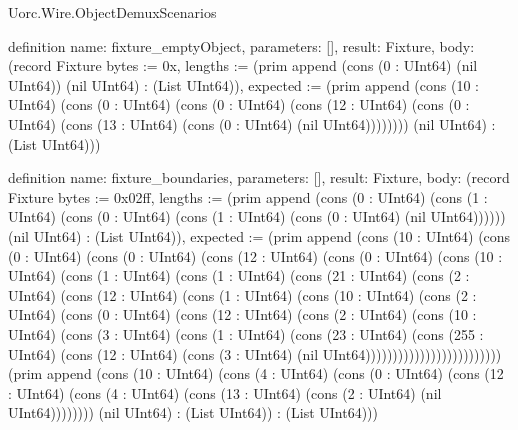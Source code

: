 \begin{lexlean}{Uorc.Wire.ObjectDemuxScenarios}
\begin{semanticmodule}
definition{
  name: fixture_emptyObject,
  parameters: [],
  result: Fixture,
  body: (record Fixture {bytes := 0x, lengths := (prim append (cons (0 : UInt64) (nil UInt64)) (nil UInt64) : (List UInt64)), expected := (prim append (cons (10 : UInt64) (cons (0 : UInt64) (cons (0 : UInt64) (cons (12 : UInt64) (cons (0 : UInt64) (cons (13 : UInt64) (cons (0 : UInt64) (nil UInt64)))))))) (nil UInt64) : (List UInt64))})
}

definition{
  name: fixture_boundaries,
  parameters: [],
  result: Fixture,
  body: (record Fixture {bytes := 0x02ff, lengths := (prim append (cons (0 : UInt64) (cons (1 : UInt64) (cons (0 : UInt64) (cons (1 : UInt64) (cons (0 : UInt64) (nil UInt64)))))) (nil UInt64) : (List UInt64)), expected := (prim append (cons (10 : UInt64) (cons (0 : UInt64) (cons (0 : UInt64) (cons (12 : UInt64) (cons (0 : UInt64) (cons (10 : UInt64) (cons (1 : UInt64) (cons (1 : UInt64) (cons (21 : UInt64) (cons (2 : UInt64) (cons (12 : UInt64) (cons (1 : UInt64) (cons (10 : UInt64) (cons (2 : UInt64) (cons (0 : UInt64) (cons (12 : UInt64) (cons (2 : UInt64) (cons (10 : UInt64) (cons (3 : UInt64) (cons (1 : UInt64) (cons (23 : UInt64) (cons (255 : UInt64) (cons (12 : UInt64) (cons (3 : UInt64) (nil UInt64))))))))))))))))))))))))) (prim append (cons (10 : UInt64) (cons (4 : UInt64) (cons (0 : UInt64) (cons (12 : UInt64) (cons (4 : UInt64) (cons (13 : UInt64) (cons (2 : UInt64) (nil UInt64)))))))) (nil UInt64) : (List UInt64)) : (List UInt64))})
}


\end{semanticmodule}
\end{lexlean}
